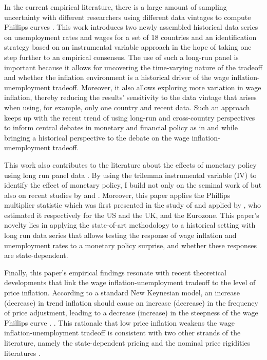 \documentclass[12pt]{article}
\begin{document}
In the current empirical literature, there is a large amount of sampling uncertainty with different researchers using different data vintages to compute Phillips curves \citep{Mavroeidis2014}. This work introduces two newly assembled historical data series on unemployment rates and wages for a set of 18 countries and an identification strategy based on an instrumental variable approach in the hope of taking one step further to an empirical consensus. The use of such a long-run panel is important because it allows for uncovering the time-varying nature of the tradeoff and whether the inflation environment is a historical driver of the wage inflation-unemployment tradeoff. Moreover, it also allows exploring more variation in wage inflation, thereby reducing the results' sensitivity to the data vintage that arises when using, for example, only one country and recent data. Such an approach keeps up with the recent trend of using long-run and cross-country perspectives to inform central debates in monetary and financial policy as in \cite{Reinhart2009} and \cite{Schularick2012} while bringing a historical perspective to the debate on the wage inflation-unemployment tradeoff.

This work also contributes to the literature about the effects of monetary policy using long run panel data \citep{Alpanda2019, Jorda2019}. By using the trilemma instrumental variable (IV) to identify the effect of monetary policy, I build not only on the seminal work of \cite{DiGiovanni2009} but also on recent studies by \cite{Jorda2019} and \cite{Schularick2020}. Moreover, this paper applies the Phillips multiplier statistic which was first presented in the study of \cite{Barnichon2019} and applied by \cite{Eser2020}, who estimated it respectively for the US and the UK, and the Eurozone. This paper's novelty lies in applying the state-of-art methodology to a historical setting with long run data series that allows testing the response of wage inflation and unemployment rates to a monetary policy surprise, and whether these responses are state-dependent.

Finally, this paper's empirical findings resonate with recent theoretical developments that link the wage inflation-unemployment tradeoff to the level of price inflation. According to a standard New Keynesian model, an increase (decrease) in trend inflation should cause an increase (decrease) in the frequency of price adjustment, leading to a decrease (increase) in the steepness of the wage Phillips curve \citep{Benati2007}. . This rationale that low price inflation weakens the wage inflation-unemployment tradeoff is consistent with two other strands of the literature, namely the state-dependent pricing \citep{Alvarez2019, Costain2022} and the nominal price rigidities literatures \citep{Tobin1972, Benigno2011, Daly2014}. 
\end{document}
